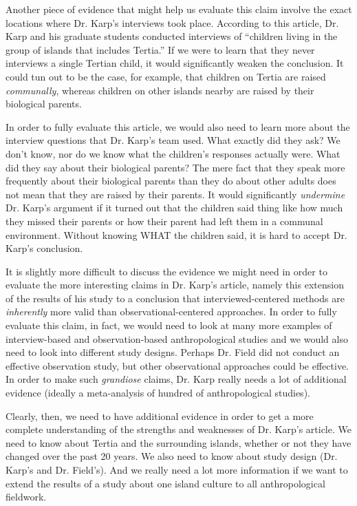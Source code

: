 Another piece of evidence that might help us evaluate this claim involve the exact locations where Dr. Karp's interviews took place.
According to this article, Dr. Karp and his graduate students conducted interviews of ``children living in the group of islands that includes Tertia.''
If we were to learn that they never interviews a single Tertian child, it would significantly weaken the conclusion.
It could tun out to be the case, for example, that children on Tertia are raised \emph{communally}, whereas children on other islands nearby are raised by their biological parents.

In order to fully evaluate this article, we would also need to learn more about the interview questions that Dr. Karp's team used.
What exactly did they ask?
We don't know, nor do we know what the children's responses actually were.
What did they say about their biological parents?
The mere fact that they speak more frequently about their biological parents than they do about other adults does not mean that they are raised by their parents.
It would significantly \emph{undermine} Dr. Karp's argument if it turned out that the children said thing like how much they missed their parents or how their parent had left them in a communal environment.
Without knowing WHAT the children said, it is hard to accept Dr. Karp's conclusion.

It is slightly more difficult to discuss the evidence we might need in order to evaluate the more interesting claims in Dr. Karp's article, namely this extension of the results of his study to a conclusion that interviewed-centered methods are \emph{inherently} more valid than observational-centered approaches.
In order to fully evaluate this claim, in fact, we would need to look at many more examples of interview-based and observation-based anthropological studies and we would also need to look into different study designs.
Perhaps Dr. Field did not conduct an effective observation study, but other observational approaches could be effective.
In order to make such \emph{grandiose} claims, Dr. Karp really needs a lot of additional evidence (ideally a meta-analysis of hundred of anthropological studies).

Clearly, then, we need to have additional evidence in order to get a more complete understanding of the strengths and weaknesses of Dr. Karp's article.
We need to know about Tertia and the surrounding islands, whether or not they have changed over the past 20 years.
We also need to know about study design (Dr. Karp's and Dr. Field's).
And we really need a lot more information if we want to extend the results of a study about one island culture to all anthropological fieldwork.



